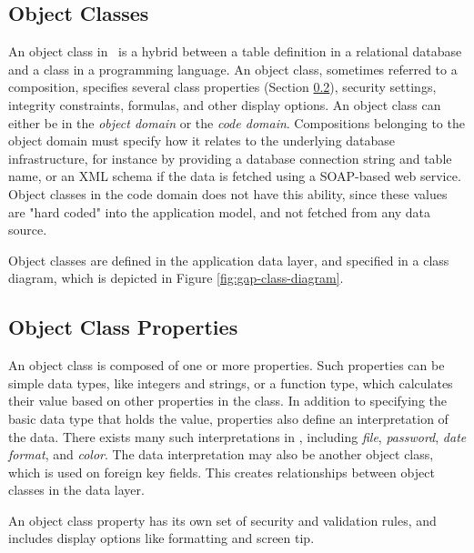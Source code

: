 \subsection{Object Classes}
\label{sub:Object Classes}
An object class in \gap~is a hybrid between a table definition in a relational database and a class in a programming language. An object class, sometimes referred to a composition, specifies several class properties (Section \ref{sub:Object Class Properties}), security settings, integrity constraints, formulas, and other display options. An object class can either be in the \textit{object domain} or the \textit{code domain}. Compositions belonging to the object domain must specify how it relates to the underlying database infrastructure, for instance by providing a database connection string and table name, or an XML schema if the data is fetched using a SOAP-based web service. Object classes in the code domain does not have this ability, since these values are "hard coded" into the application model, and not fetched from any data source.

Object classes are defined in the application data layer, and specified in a class diagram, which is depicted in Figure \ref{fig:gap-class-diagram}.


\subsection{Object Class Properties}
\label{sub:Object Class Properties}
An object class is composed of one or more properties. Such properties can be simple data types, like integers and strings, or a function type, which calculates their value based on other properties in the class. In addition to specifying the basic data type that holds the value, properties also define an interpretation of the data. There exists many such interpretations in \gap, including \textit{file}, \textit{password}, \textit{date format}, and \textit{color}. The data interpretation may also be another object class, which is used on foreign key fields. This creates relationships between object classes in the data layer.

An object class property has its own set of security and validation rules, and includes display options like formatting and screen tip.

